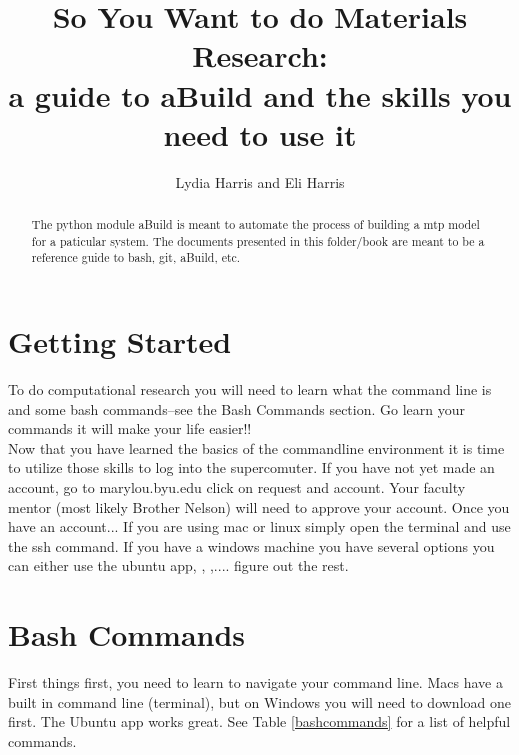 \documentclass{article}
\title{So You Want to do Materials Research:\\[0.02em]\smaller{}a
guide to aBuild and the skills you need to use it}
\author{Lydia Harris and Eli Harris}
\begin{document}
\maketitle
\begin{abstract}
 The python module aBuild is meant to automate the process of
 building a mtp model for a paticular system. The documents presented
 in this folder/book are meant to be a reference guide to bash, git, aBuild, etc.
\end{abstract}

\section{Getting Started}
To do computational research you will need to learn what the command
line is and some bash commands--see the Bash Commands section. Go
learn your commands it will make your life easier!!\\
Now that you have learned the basics of the commandline environment it
is time to utilize those skills to log into the supercomuter. If you
have not yet made an account, go to marylou.byu.edu click on request
and account. Your faculty mentor (most likely Brother Nelson) will
need to approve your account. Once you have an account...
If you are using mac or linux simply open the terminal and use the ssh
command.  If you have a windows machine you have several options you
can either use the ubuntu app, , ,.... figure out the rest.



\section{Bash Commands}

First things first, you need to learn to navigate your command
line. Macs have a built in command line (terminal), but on Windows you will need
to download one first. The Ubuntu app works great. See Table
\ref{bashcommands} for a list of helpful commands. 
\end{document}
